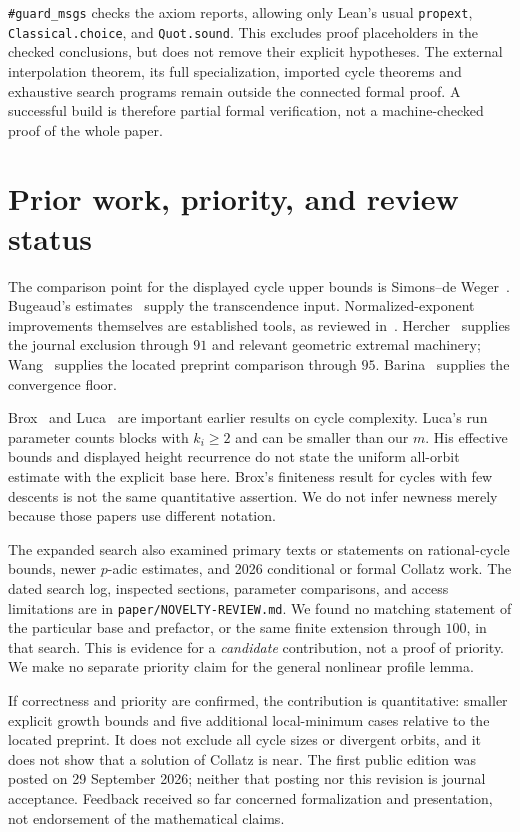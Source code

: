\documentclass[11pt]{article}
\theoremstyle{definition}\newtheorem{definition}[theorem]{Definition}
\begin{document}
\texttt{\#guard\_msgs} checks the axiom reports, allowing only Lean's usual \texttt{propext}, \texttt{Classical.choice}, and \texttt{Quot.sound}. This excludes proof placeholders in the checked conclusions, but does not remove their explicit hypotheses. The external interpolation theorem, its full specialization, imported cycle theorems and exhaustive search programs remain outside the connected formal proof. A successful build is therefore partial formal verification, not a machine-checked proof of the whole paper.

\section{Prior work, priority, and review status}\label{sec:prior}
The comparison point for the displayed cycle upper bounds is Simons--de Weger~\cite{sdw}. Bugeaud's estimates~\cite{bugeaud99,bugeaud02} supply the transcendence input. Normalized-exponent improvements themselves are established tools, as reviewed in~\cite{bprime}. Hercher~\cite{hercher} supplies the journal exclusion through $91$ and relevant geometric extremal machinery; Wang~\cite{wang} supplies the located preprint comparison through $95$. Barina~\cite{barina} supplies the convergence floor.

Brox~\cite{brox} and Luca~\cite{luca} are important earlier results on cycle complexity. Luca's run parameter counts blocks with $k_i\ge2$ and can be smaller than our $m$. His effective bounds and displayed height recurrence do not state the uniform all-orbit estimate with the explicit base here. Brox's finiteness result for cycles with few descents is not the same quantitative assertion. We do not infer newness merely because those papers use different notation.

The expanded search also examined primary texts or statements on rational-cycle bounds, newer $p$-adic estimates, and 2026 conditional or formal Collatz work. The dated search log, inspected sections, parameter comparisons, and access limitations are in \texttt{paper/NOVELTY-REVIEW.md}. We found no matching statement of the particular base and prefactor, or the same finite extension through $100$, in that search. This is evidence for a \emph{candidate} contribution, not a proof of priority. We make no separate priority claim for the general nonlinear profile lemma.

If correctness and priority are confirmed, the contribution is quantitative: smaller explicit growth bounds and five additional local-minimum cases relative to the located preprint. It does not exclude all cycle sizes or divergent orbits, and it does not show that a solution of Collatz is near. The first public edition was posted on 29 September 2026; neither that posting nor this revision is journal acceptance. Feedback received so far concerned formalization and presentation, not endorsement of the mathematical claims.
\end{document}
